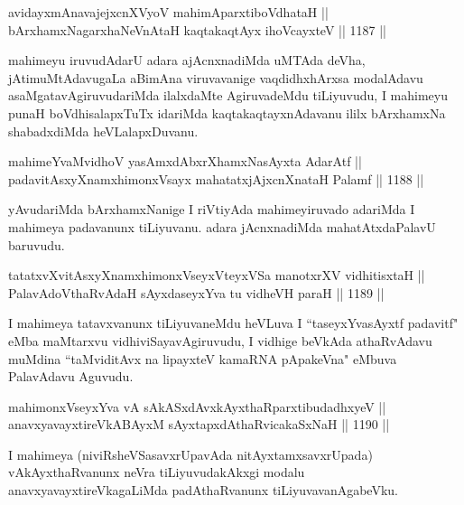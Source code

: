 \begin{shl}
avidayxmAnavajejxcnXVyoV mahimAparxtiboVdhataH || \\
bArxhamxNagarxhaNeVnAtaH kaqtakaqtAyx ihoVcayxteV \hfill || 1187 ||  
\end{shl}

\begin{artha}
mahimeyu iruvudAdarU adara ajAcnxnadiMda uMTAda deVha, jAtimuMtAdavugaLa aBimAna viruvavanige vaqdidhxhArxsa modalAdavu asaMgatavAgiruvudariMda ilalxdaMte AgiruvadeMdu tiLiyuvudu, I mahimeyu punaH boVdhisalapxTuTx idariMda kaqtakaqtayxnAdavanu ililx bArxhamxNa shabadxdiMda heVLalapxDuvanu.
\end{artha}


\begin{shl}
mahimeYvaMvidhoV yasAmxdAbxrXhamxNasAyxta AdarAtf || \\
padavitAsxyXnamxhimonxV\s sayx mahatatxjAjxcnXnataH Palamf \hfill || 1188 ||  
\end{shl}

\begin{artha}
yAvudariMda bArxhamxNanige I riVtiyAda mahimeyiruvado adariMda I mahimeya padavanunx tiLiyuvanu. adara jAcnxnadiMda mahatAtxdaPalavU baruvudu.
\end{artha}


\begin{shl}
tatatxvXvitAsxyXnamxhimonxV\s seyxVteyxVSa manotxrXV vidhitisxtaH || \\
PalavAdoV\s thaRvAdaH sAyxdaseyxYva tu vidheVH paraH \hfill || 1189 ||  
\end{shl}

\begin{artha}
I mahimeya tatavxvanunx tiLiyuvaneMdu heVLuva I ``taseyxYvasAyxtf padavitf" eMba maMtarxvu vidhiviSayavAgiruvudu, I vidhige beVkAda athaRvAdavu muMdina ``taMviditAvx na lipayxteV kamaRNA pApakeVna" eMbuva PalavAdavu Aguvudu.
\end{artha}

\begin{shl}
mahimonxV\s seyxYva vA sAkASxdAvxkAyxthaRparxtibudadhxyeV || \\
anavxyavayxtireVkABAyxM sAyxtapxdAthaRvicakaSxNaH \hfill || 1190 ||  
\end{shl}

\begin{artha}
I mahimeya (niviRsheVSasavxrUpavAda nitAyxtamxsavxrUpada) vAkAyxthaRvanunx neVra tiLiyuvudakAkxgi modalu anavxyavayxtireVkagaLiMda padAthaRvanunx tiLiyuvavanAgabeVku.
\end{artha}

